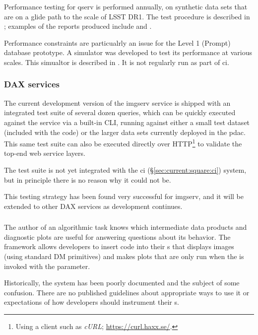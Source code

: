 \documentclass[DM,authoryear,toc,lsstdraft]{lsstdoc}
\begin{document}
Performance testing for qserv is performed annually, on synthetic
data sets that are on a glide path to the scale of LSST DR1. The test
procedure is described in ; examples of the reports produced
include  and .

Performance constraints are particualrly an issue for the Level 1 (Prompt)
database prototype. A simulator was developed to test its performance at
various scales. This simualtor is described in . It is not
regularly run as part of \gls{ci}.

\subsubsection{DAX services}

The current development version of the imgserv service is shipped with an
integrated test suite of several dozen queries, which can be quickly executed
against the service via a built-in CLI, running against either a small test
dataset (included with the code) or the larger data sets currently deployed in
the \gls{pdac}. This same test suite can also be executed directly over
HTTP\footnote{Using a client such as \textit{cURL};
\url{https://curl.haxx.se/}.} to validate the top-end web service layers.

The test suite is not yet integrated with the \gls{ci}
(\S\ref{sec:current:square:ci}) system, but in principle there is no reason
why it could not be.

This testing strategy has been found very successful for imgserv, and
it will be extended to other DAX services as development continues.

\subsubsection{}
\label{sec:current:dax:debugopt}

The author of an algorithmic task knows which intermediate data products and
diagnostic plots are useful for answering questions about its behavior. The
 framework allows developers to insert code into their
s that displays images (using standard DM primitives) and makes
plots that are only run when the  is invoked with the
 parameter.

Historically, the  system has been poorly documented and the
subject of some confusion. There are no published guidelines about appropriate
ways to use it or expectations of how developers should instrument their
s.
\end{document}
